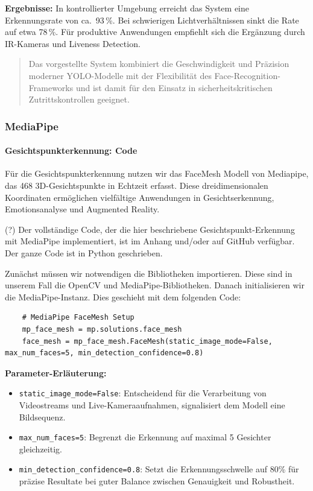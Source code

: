 \textbf{Ergebnisse:} In kontrollierter Umgebung erreicht das System eine Erkennungsrate von ca.~93\,\%. Bei schwierigen Lichtverhältnissen sinkt die Rate auf etwa 78\,\%. Für produktive Anwendungen empfiehlt sich die Ergänzung durch IR-Kameras und Liveness Detection.

\begin{quote}
Das vorgestellte System kombiniert die Geschwindigkeit und Präzision moderner YOLO-Modelle mit der Flexibilität des Face-Recognition-Frameworks und ist damit für den Einsatz in sicherheitskritischen Zutrittskontrollen geeignet.
\end{quote}

\subsubsection{MediaPipe}
\paragraph{Gesichtspunkterkennung: Code} 

Für die Gesichtspunkterkennung nutzen wir das FaceMesh Modell von Mediapipe, das 468 3D-Gesichtspunkte in Echtzeit erfasst. Diese dreidimensionalen Koordinaten ermöglichen vielfältige Anwendungen in Gesichtserkennung, Emotionsanalyse und Augmented Reality.

(?) Der vollständige Code, der die hier beschriebene Gesichtspunkt-Erkennung mit MediaPipe implementiert, ist im Anhang und/oder auf GitHub verfügbar.
Der ganze Code ist in Python geschrieben.

Zunächst müssen wir notwendigen die Bibliotheken importieren. Diese sind in unserem Fall die OpenCV und MediaPipe-Bibliotheken.
Danach initialisieren wir die MediaPipe-Instanz. Dies geschieht mit dem folgenden Code:
\begin{lstlisting}
    # MediaPipe FaceMesh Setup
    mp_face_mesh = mp.solutions.face_mesh
    face_mesh = mp_face_mesh.FaceMesh(static_image_mode=False, max_num_faces=5, min_detection_confidence=0.8)
\end{lstlisting}

\textbf{Parameter-Erläuterung:}
\begin{itemize}
    \item \texttt{static\_image\_mode=False}: Entscheidend für die Verarbeitung von Videostreams und Live-Kameraaufnahmen, signalisiert dem Modell eine Bildsequenz.
    \item \texttt{max\_num\_faces=5}: Begrenzt die Erkennung auf maximal 5 Gesichter gleichzeitig.
    \item \texttt{min\_detection\_confidence=0.8}: Setzt die Erkennungsschwelle auf 80\% für präzise Resultate bei guter Balance zwischen Genauigkeit und Robustheit.
\end{itemize}

